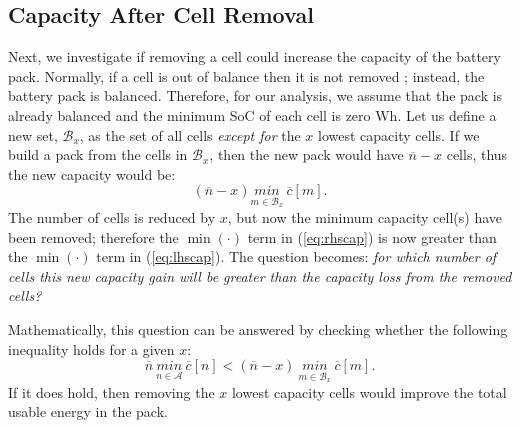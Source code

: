 \documentclass[10pt,twocolumn]{IEEEtran}
\begin{document}
\subsection{Capacity After Cell Removal }
Next, we investigate  if removing a cell could increase the capacity of the battery pack.
Normally,  if  a cell is out of balance then it is  not removed ;  instead,  the battery  pack is balanced.
Therefore, for our analysis,   we assume that the pack is already balanced and the minimum SoC of each cell is zero Wh.
Let us define a new set, $\mathcal{B}_x$, as the set of all cells \emph{except for}  the $x$ lowest capacity cells.
If we build a pack from the cells in  $\mathcal{B}_x$,  then the new pack would have $\overline{n} - x$ cells, thus the new capacity would be:
%
\begin{equation}
\label{eq:rhscap}
(\overline{n}-x) \underset{m\in \mathcal{B}_x}{min} \ \overline c[m].
\end{equation}
%
The number of cells is reduced by $x$, but now the minimum capacity cell(s) have been removed; therefore the $\min(\cdot)$ term in (\ref{eq:rhscap}) is now greater than the $\min(\cdot)$ term in (\ref{eq:lhscap}).
 The question   becomes: \emph{ for which number of cells  this new capacity gain will be greater than the capacity loss from the removed cells? }

Mathematically, this question can be answered by checking   whether the following inequality  holds for a given $x$: 
%
\begin{equation}
\overline{n} \  \underset{n\in \mathcal{A}}{min} \ \overline c[n] < (\overline{n}-x) \ \underset{m\in \mathcal{B}_x}{min} \ \overline c[m].
\label{eq:removecellineq}
\end{equation}
%
  If it  does hold, then removing the $x$ lowest capacity cells would  improve the total usable energy in the pack. 
\end{document}

